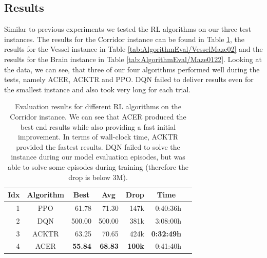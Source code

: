 \subsection{Results}

Similar to previous experiments we tested the RL algorithms on our three test instances. The results for the Corridor instance can be found in Table \ref{tab:AlgorithmEval/Maze0318}, the results for the Vessel instance in Table \ref{tab:AlgorithmEval/VesselMaze02} and the results for the Brain instance in Table \ref{tab:AlgorithmEval/Maze0122}. Looking at the data, we can see, that three of our four algorithms performed well during the tests, namely ACER, ACKTR and PPO. DQN failed to deliver results even for the smallest instance and also took very long for each trial.

\begin{table}[htp]
    \begin{center}
        \begin{tabular}{rcrrrrr}
            \toprule
            \multicolumn{1}{c}{Idx} & \multicolumn{1}{c}{Algorithm} & \multicolumn{1}{c}{Best} & \multicolumn{1}{c}{Avg} & \multicolumn{1}{c}{Drop} & \multicolumn{1}{c}{Time}\\
            \midrule
            1 & PPO & 61.78 & 71.30 & 147k & 0:40:36h \\
            2 & DQN & 500.00 & 500.00 & 381k & 3:08:00h \\
            3 & ACKTR & 63.25 & 70.65 & 424k & \textbf{0:32:49h} \\
            4 & ACER & \textbf{55.84} & \textbf{68.83} & \textbf{100k} & 0:41:40h \\
            \bottomrule
        \end{tabular}
    \end{center}
    \caption[Evaluation of RL Algorithms on the Corridor Instance]{Evaluation results for different RL algorithms on the Corridor instance. We can see that ACER produced the best end results while also providing a fast initial improvement. In terms of wall-clock time, ACKTR provided the fastest results. DQN failed to solve the instance during our model evaluation episodes, but was able to solve some episodes during training (therefore the drop is below 3M).} \label{tab:AlgorithmEval/Maze0318}
\end{table}


